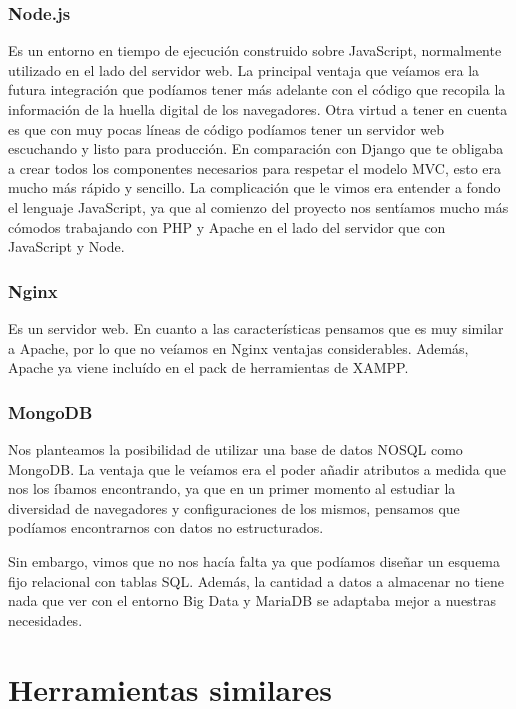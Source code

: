 \subsubsection{Node.js}
Es un entorno en tiempo de ejecución construido sobre JavaScript, normalmente utilizado en el lado del servidor web. La principal ventaja que veíamos era la futura integración que podíamos tener más adelante con el código que recopila la información de la huella digital de los navegadores. Otra virtud a tener en cuenta es que con muy pocas líneas de código podíamos tener un servidor web escuchando y listo para producción. En comparación con Django que te obligaba a crear todos los componentes necesarios para respetar el modelo MVC, esto era mucho más rápido y sencillo. La complicación que le vimos era entender a fondo el lenguaje JavaScript, ya que al comienzo del proyecto nos sentíamos mucho más cómodos trabajando con PHP y Apache en el lado del servidor que con JavaScript y Node. \par 

\subsubsection{Nginx}
Es un servidor web. En cuanto a las características pensamos que es muy similar a Apache, por lo que no veíamos en Nginx ventajas considerables. Además, Apache ya viene incluído en el pack de herramientas de XAMPP. \par 

\subsubsection{MongoDB}
Nos planteamos la posibilidad de utilizar una base de datos NOSQL como MongoDB. La ventaja que le veíamos era el poder añadir atributos a medida que nos los íbamos encontrando, ya que en un primer momento al estudiar la diversidad de navegadores y configuraciones de los mismos, pensamos que podíamos encontrarnos con datos no estructurados. \par 

Sin embargo, vimos que no nos hacía falta ya que podíamos diseñar un esquema fijo relacional con tablas SQL. Además, la cantidad a datos a almacenar no tiene nada que ver con el entorno Big Data y MariaDB se adaptaba mejor a nuestras necesidades. \par 

\section{Herramientas similares}


